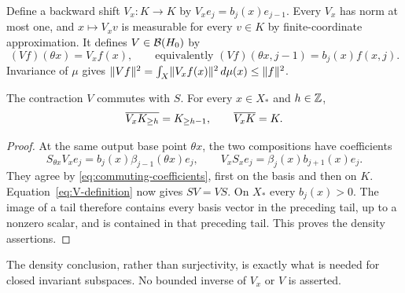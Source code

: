 Define a backward shift $V_x:K\to K$ by $V_xe_j=b_j(x)e_{j-1}$. Every $V_x$ has norm at most one, and $x\mapsto V_xv$ is measurable for every $v\in K$ by finite-coordinate approximation. It defines $V\in\mathcal B(H_0)$ by
\begin{equation}\label{eq:V-definition}
 (Vf)(\theta x)=V_xf(x),
 \qquad\text{equivalently }(Vf)(\theta x,j-1)=b_j(x)f(x,j).
\end{equation}
Invariance of $\mu$ gives $\lVert Vf\rVert^2=\int_X\lVert V_xf(x)\rVert^2\,d\mu(x)\le\lVert f\rVert^2$.

\begin{proposition}\label{prop:V}
The contraction $V$ commutes with $S$. For every $x\in X_*$ and $h\in\mathbb Z$,
\[
 \overline{V_xK_{\ge h}}=K_{\ge h-1},\qquad
 \overline{V_xK}=K.
\]
\end{proposition}
\begin{proof}
At the same output base point $\theta x$, the two compositions have coefficients
\[
 S_{\theta x}V_xe_j=b_j(x)\beta_{j-1}(\theta x)e_j,
 \qquad
 V_xS_xe_j=\beta_j(x)b_{j+1}(x)e_j.
\]
They agree by \eqref{eq:commuting-coefficients}, first on the basis and then on $K$. Equation~\eqref{eq:V-definition} now gives $SV=VS$. On $X_*$ every $b_j(x)>0$. The image of a tail therefore contains every basis vector in the preceding tail, up to a nonzero scalar, and is contained in that preceding tail. This proves the density assertions.
\end{proof}


The density conclusion, rather than surjectivity, is exactly what is needed for closed invariant subspaces. No bounded inverse of $V_x$ or $V$ is asserted.
